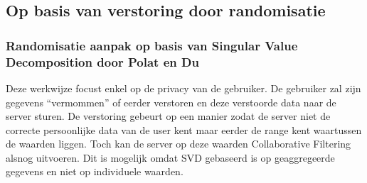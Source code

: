 \pagebreak
\subsection{Op basis van verstoring door randomisatie}
\label{randomisatie}
\subsubsection{Randomisatie aanpak op basis van Singular Value Decomposition door Polat en Du \cite{Polat:2005:SCF:1066677.1066860}}

Deze werkwijze focust enkel op de privacy van de gebruiker. De gebruiker zal zijn gegevens “vermommen” of eerder verstoren en deze verstoorde data naar de server sturen. De verstoring gebeurt op een manier zodat de server niet de correcte persoonlijke data van de user kent maar eerder de range kent waartussen de waarden liggen. Toch kan de server op deze waarden Collaborative Filtering alsnog uitvoeren. Dit is mogelijk omdat SVD gebaseerd is op geaggregeerde gegevens en niet op individuele waarden.

